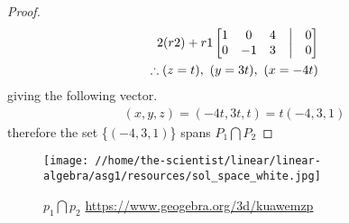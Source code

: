 \documentclass[12pt]{article}
\begin{document}
\begin{enumerate}
\begin{enumerate}
\begin{proof}
\begin{align*}
                                            2(r2)+r1
                                            \begin{bmatrix}
                                                    1 & 0  & 4 & \bigm| & 0 \\
                                                    0 & -1 & 3 & \bigm| & 0 \\
                                            \end{bmatrix} \\
                                            \therefore (z=t),\ (y=3t),\ (x=-4t)
                                    \end{align*}
                                    giving the following vector.
                                    \begin{align*}
                                            (x,y,z) = (-4t, 3t, t) = t(-4, 3, 1)
                                    \end{align*}
                                    therefore the set \{$(-4, 3, 1)$\} spans $P_1 \bigcap P_2$
                            \end{proof}
              \end{enumerate}
              \begin{figure}[htbp]
                      \centering
                      \texttt{[image: //home/the-scientist/linear/linear-algebra/asg1/resources/sol\_space\_white.jpg]}
                      \caption{$p_{1} \bigcap p_{2}$ \url{https://www.geogebra.org/3d/kuawemzp}\label{fig:solution space}}
              \end{figure}
\end{enumerate}
\end{document}
